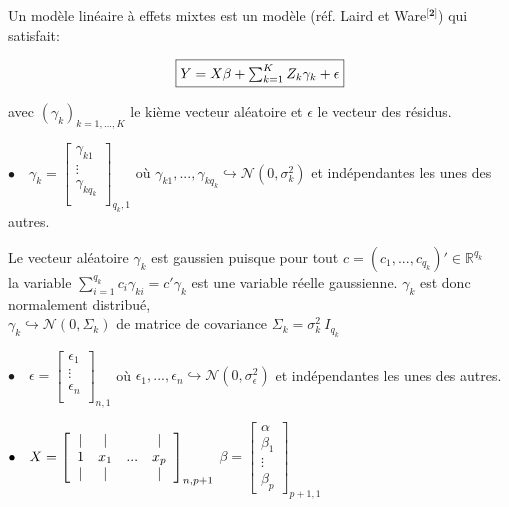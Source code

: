 \documentclass[11pt,fleqn]{book} %
\begin{document}
	\vspace{1em}
	
	Un modèle linéaire à effets mixtes est un modèle (réf. Laird et Ware$^{\textbf{[2]}}$) qui satisfait:
	
	\begin{equation}
		\fbox{$
			Y=X\beta+\sum_{k=1}^{K} Z_k \gamma_k+\epsilon
			$}
	\end{equation}
	
	\vspace{1em}
	
	avec $(\gamma_k)_{k=1,...,K}$ le kième vecteur aléatoire et $\epsilon$ le vecteur des résidus.
	
	\vspace{1em} 
	
	$\bullet\quad \gamma_k=\left[
	\begin{array}{ c }
		\gamma_{k1}  \\
		\vdots   \\
		\gamma_{k q_k}  \\ 
	\end{array} \right]_{q_k,1}$  \quad où \: $\gamma_{k1},..., \gamma_{k q_k}\hookrightarrow\mathcal{N}(0,\sigma_k^2)$ \: et indépendantes les unes des autres.
	
	\vspace{1em}
	
	Le vecteur aléatoire $\gamma_k$ est gaussien puisque pour tout $c=(c_1, ... ,c_{q_k})'\in \mathbb{R}^{q_k}$ \\ la variable
	$\sum_{i=1}^{q_k} c_i\gamma_{k i}= c'\gamma_k $ est une variable réelle gaussienne. $\gamma_k$ est donc normalement distribué,\\ 
	$\gamma_k\hookrightarrow\mathcal{N}(0,\Sigma_k)$ de matrice de covariance $\Sigma_k=\sigma_k^2 \: I_{q_k}$ 
	
	\vspace{1em}
	
	$\bullet \quad \epsilon=\left[
	\begin{array}{ c }
		\epsilon_{1}  \\
		\vdots   \\
		\epsilon_{n}  \\ 
	\end{array} \right]_{n,1}$  \quad où \: $\epsilon_{1},..., \epsilon_{n}\hookrightarrow\mathcal{N}(0,\sigma_{\epsilon}^2)$ \: et indépendantes les unes des autres.
	
	\vspace{1em}
	
	
	$\bullet \quad X=\left[
	\begin{array}{ c c c c }
		|  & | & & | \\
		1 & x_1 & ... & x_p  \\
		|  & | & & |
	\end{array} \right]_{n,p+1}$ \quad $\beta=\left[
	\begin{array}{ c }
		\alpha  \\
		\beta_1   \\
		\vdots  \\
		\beta_p  
	\end{array} \right]_{p+1,1} $
	
\end{document}
